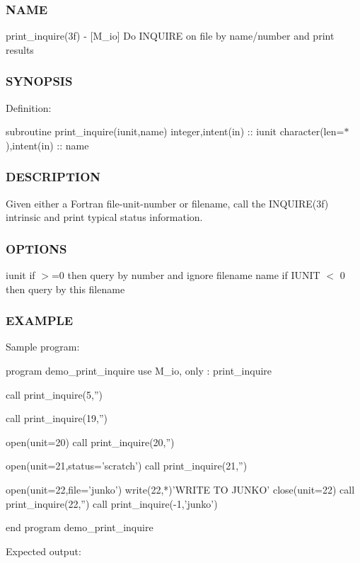 \subsubsection*{N\+A\+ME}

print\+\_\+inquire(3f) -\/ \mbox{[}M\+\_\+io\mbox{]} Do I\+N\+Q\+U\+I\+RE on file by name/number and print results \subsubsection*{S\+Y\+N\+O\+P\+S\+IS}

Definition\+:

subroutine print\+\_\+inquire(iunit,name) integer,intent(in) \+:\+: iunit character(len=$\ast$),intent(in) \+:\+: name \subsubsection*{D\+E\+S\+C\+R\+I\+P\+T\+I\+ON}

Given either a Fortran file-\/unit-\/number or filename, call the I\+N\+Q\+U\+I\+R\+E(3f) intrinsic and print typical status information. \subsubsection*{O\+P\+T\+I\+O\+NS}

iunit if $>$=0 then query by number and ignore filename name if I\+U\+N\+IT $<$ 0 then query by this filename \subsubsection*{E\+X\+A\+M\+P\+LE}

\begin{DoxyVerb}Sample program:

   program demo_print_inquire
   use M_io, only : print_inquire

   call print_inquire(5,'')

   call print_inquire(19,'')

   open(unit=20)
   call print_inquire(20,'')

   open(unit=21,status='scratch')
   call print_inquire(21,'')

   open(unit=22,file='junko')
   write(22,*)'WRITE TO JUNKO'
   close(unit=22)
   call print_inquire(22,'')
   call print_inquire(-1,'junko')

   end program demo_print_inquire
\end{DoxyVerb}


Expected output\+: 

